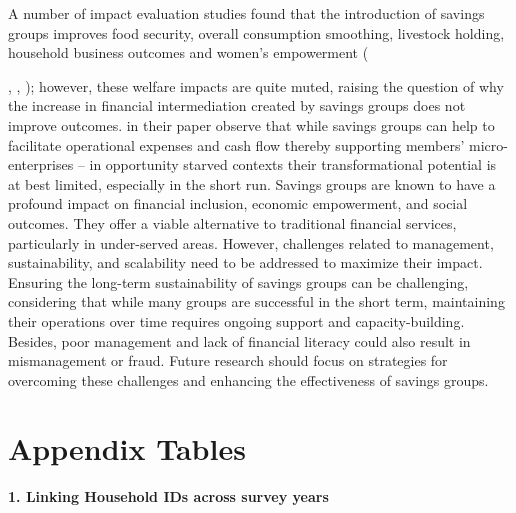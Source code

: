\documentclass[12pt]{article}
\begin{document}
{\hspace{1cm} A number of impact evaluation studies found that the introduction of savings groups improves food security, overall consumption smoothing, livestock holding, household business outcomes and women’s empowerment ({\cite{beaman}, \cite{gash}, \cite{karlan}); however, these welfare impacts are quite muted, raising the question of why the increase in financial intermediation created by savings groups does not improve outcomes. \cite{Flynn} in their paper observe that while savings groups can help to facilitate operational expenses and cash flow thereby supporting members’ micro-enterprises – in opportunity starved contexts their transformational potential is at best limited, especially in the short run. Savings groups are known to have a profound impact on financial inclusion, economic empowerment, and social outcomes. They offer a viable alternative to traditional financial services, particularly in under-served areas. However, challenges related to management, sustainability, and scalability need to be addressed to maximize their impact. Ensuring the long-term sustainability of savings groups can be challenging, considering that while many groups are successful in the short term, maintaining their operations over time requires ongoing support and capacity-building. Besides, poor management and lack of financial literacy could also result in mismanagement or fraud. Future research should focus on strategies for overcoming these challenges and enhancing the effectiveness of savings groups.


\newpage

\printbibliography

\newpage
\section*{Appendix Tables}\label{sec:appendix}

\textbf{1. Linking Household IDs across survey years}

}}
\end{document}
